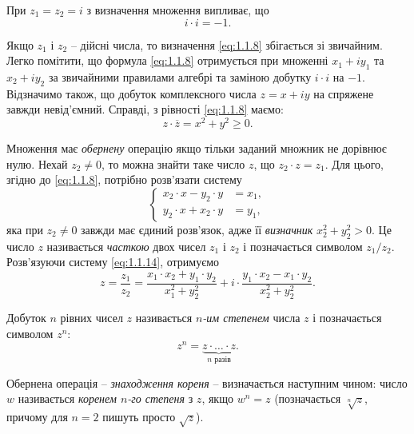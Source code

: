 При $z_1 = z_2 = i$ з визначення множення випливає, що
\begin{equation}
	\label{eq:1.1.12}
	i \cdot i = -1.
\end{equation}

Якщо $z_1$ і $z_2$ -- дійсні числа, то визначення \eqref{eq:1.1.8} збігається зі звичайним. \\

Легко помітити, що формула \eqref{eq:1.1.8} отримується при множенні $x_1 + i y_1$ та $x_2 + i y_2$ за звичайними правилами алгебрі та заміною добутку $i \cdot i$ на $-1$. \\

Відзначимо також, що добуток комплексного числа $z = x + i y$ на спряжене завжди невід'ємний. Справді, з рівності \eqref{eq:1.1.8} маємо:
\begin{equation}
	\label{eq:1.1.13}
	z \cdot \overline{z} = x^2 + y^2 \ge 0.
\end{equation}

Множення має \textit{обернену} операцію якщо тільки заданий множник не дорівнює нулю. Нехай $z_2 \ne 0$, то можна знайти таке число $z$, що $z_2 \cdot z = z_1$. Для цього, згідно до \eqref{eq:1.1.8}, потрібно розв'язати систему
\begin{equation}
	\label{eq:1.1.14}
	\left\{
		\begin{aligned}
			x_2 \cdot x - y_2 \cdot y &= x_1, \\
			y_2 \cdot x + x_2 \cdot y &= y_1,
		\end{aligned}
	\right.
\end{equation}
яка при $z_2 \ne 0$ завжди має єдиний розв'язок, адже її \textit{визначник} $x_2^2 + y_2^2 > 0$. Це число $z$ називається \textit{часткою} двох чисел $z_1$ і $z_2$ і позначається символом $z_1 / z_2$. Розв'язуючи систему \eqref{eq:1.1.14}, отримуємо
\begin{equation}
	\label{eq:1.1.15}
	z = \dfrac{z_1}{z_2} = \frac{x_1 \cdot x_2 + y_1 \cdot y_2}{x_1^2 + y_2^2} + i \cdot \frac{y_1 \cdot x_2 - x_1 \cdot y_2}{x_2^2 + y_2^2}.
\end{equation}

Добуток $n$ рівних чисел $z$ називається \textit{$n$-им степенем} числа $z$ і позначається символом $z^n$:
\begin{equation}
	\label{eq:1.1.16}
	z^n = \underset{n \text{ разів}}{\underbrace{z \cdot \ldots \cdot z}}.
\end{equation}

Обернена операція -- \textit{знаходження кореня} -- визначається наступним чином: число $w$ називається \textit{коренем $n$-го степеня} з $z$, якщо $w^n = z$ (позначається $\sqrt[n]{z}$, причому для $n = 2$ пишуть просто $\sqrt{z}$). \\

